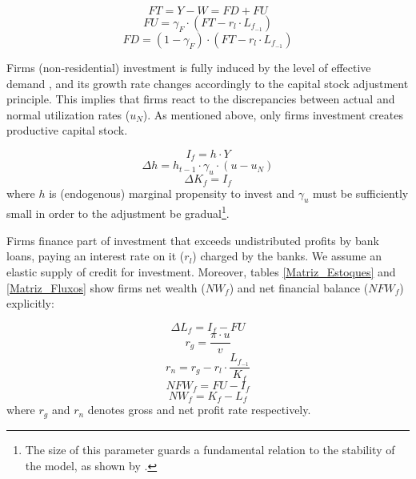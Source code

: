 \documentclass[11pt]{article}
\begin{document}
\begin{equation}
\label{_FT}
    FT = Y - W = FD + FU
\end{equation}
\begin{equation}
    FU = \gamma_F\cdot (FT - r_l\cdot L_{f_{-1}})
\end{equation}
\begin{equation}
    FD = (1-\gamma_F)\cdot (FT - r_l\cdot L_{f_{-1}})
\end{equation}

Firms (non-residential) investment is fully induced by the level of effective demand \cite{freitas_growth_2015}, and its growth rate changes accordingly to the capital stock adjustment principle. 
This implies that firms react to the discrepancies between actual and normal utilization rates (\(u_N\)). 
As mentioned above, only firms investment creates productive capital stock.

\begin{equation}
\label{_If}
    I_f = h\cdot Y
\end{equation}
\begin{equation}
\label{_h}
    \Delta h = h_{t-1}\cdot \gamma_u\cdot (u - u_N)
\end{equation}
\begin{equation}
    \Delta K_f = I_f
\end{equation}
where \(h\) is (endogenous) marginal propensity to invest and \(\gamma_u\) must be sufficiently small in order to the adjustment be gradual\footnote{The size of this parameter guards a fundamental relation to the stability of the model, as shown by \textcite{freitas_growth_2015}.}.


Firms finance part of investment that exceeds undistributed profits by bank loans, paying an interest rate on it (\(r_l\)) charged by the banks. 
We assume an elastic supply of credit for investment. 
Moreover, tables \ref{Matriz_Estoques} and \ref{Matriz_Fluxos} show firms net wealth (\(NW_f\)) and net financial balance (\(NFW_f\)) explicitly:

\begin{equation}
\label{_Lf}
    \Delta L_f = I_f - FU
\end{equation}
$$
r_g = \frac{\pi\cdot u}{v}
$$
$$
r_n = r_g - r_l\cdot\frac{L_{f_{-1}}}{K_f}
$$
\begin{equation}
    NFW_f = FU - I_f
\end{equation}
\begin{equation}
    NW_f = K_f - L_f
\end{equation}
where \(r_g\) and \(r_n\) denotes gross and net profit rate respectively.
\end{document}
